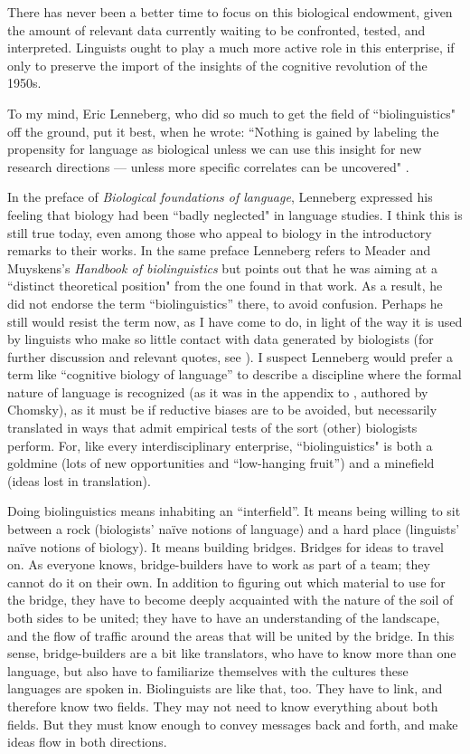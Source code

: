 There has never been a better time to focus on this biological endowment, given the amount of relevant data currently waiting to be confronted, tested, and interpreted. Linguists ought to play a much more active role in this enterprise, if only to preserve the import of the insights of the cognitive revolution of the 1950s.

To my mind, Eric Lenneberg, who did so much to get the field of ``biolinguistics" off the ground, put it best, when he wrote: ``Nothing is gained by labeling the propensity for language as biological unless we can use this insight for new research directions — unless more specific correlates can be uncovered" \citep{Lenneberg1967biological}.

In the preface of \textit{Biological foundations of language}, Lenneberg expressed his feeling that biology had been ``badly neglected" in language studies. I think this is still true today, even among those who appeal to biology in the introductory remarks to their works. In the same preface Lenneberg refers to Meader and Muyskens's \textit{Handbook of biolinguistics} \citep{meader1950handbook} but points out that he was aiming at a ``distinct theoretical position" from the one found in that work. As a result, he did not endorse the term ``biolinguistics'' there, to avoid confusion. Perhaps he still would resist the term now, as I have come to do, in light of the way it is used by linguists who make so little contact with data generated by biologists (for further discussion and relevant quotes, see \cite{martins2016we}). I suspect Lenneberg would prefer a term like ``cognitive biology of language'' to describe a discipline where the formal nature of language is recognized (as it was in the appendix to \cite{Lenneberg1967biological}, authored by Chomsky), as it must be if reductive biases are to be avoided, but necessarily translated in ways that admit empirical tests of the sort (other) biologists perform. For, like every interdisciplinary enterprise, ``biolinguistics" is both a goldmine (lots of new opportunities and ``low-hanging fruit'') and a minefield (ideas lost in translation).

Doing biolinguistics means inhabiting an ``interfield''. It means being willing to sit between a rock (biologists' naïve notions of language) and a hard place (linguists' naïve notions of biology). It means building bridges. Bridges for ideas to travel on. As everyone knows, bridge-builders have to work as part of a team; they cannot do it on their own. In addition to figuring out which material to use for the bridge, they have to become deeply acquainted with the nature of the soil of both sides to be united; they have to have an understanding of the landscape, and the flow of traffic around the areas that will be united by the bridge. In this sense, bridge-builders are a bit like translators, who have to know more than one language, but also have to familiarize themselves with the cultures these languages are spoken in. Biolinguists are like that, too. They have to link, and therefore know two fields. They may not need to know everything about both fields. But they must know enough to convey messages back and forth, and make ideas flow in both directions.

